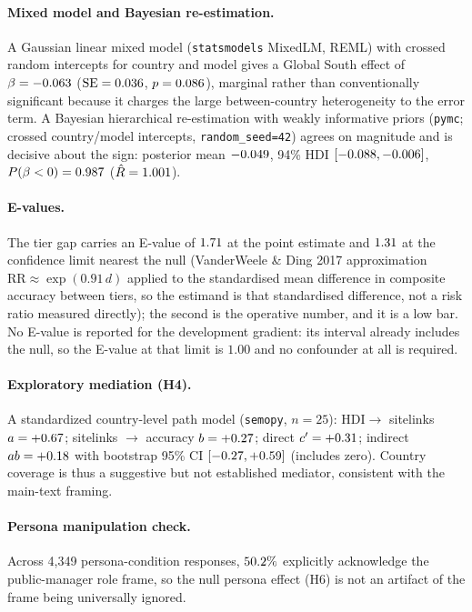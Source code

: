 \documentclass[11pt,a4paper]{article}
\begin{document}
\paragraph{Mixed model and Bayesian re-estimation.} A Gaussian linear mixed model
(\texttt{statsmodels} MixedLM, REML) with crossed random intercepts for country and
model gives a Global South effect of $\beta=-0.063$ ($\mathrm{SE}=0.036$,
$p=0.086$), marginal rather than conventionally significant because it charges the
large between-country heterogeneity to the error term. A Bayesian hierarchical
re-estimation with weakly informative priors (\texttt{pymc}; crossed country/model
intercepts, \texttt{random\_seed=42}) agrees on magnitude and is decisive about the
sign: posterior mean $-0.049$, 94\% HDI $[-0.088,-0.006]$, $P(\beta<0)=0.987$
($\hat{R}=1.001$).

\paragraph{E-values.} The tier gap carries an E-value of $1.71$ at the point
estimate and $1.31$ at the confidence limit nearest the null (VanderWeele \& Ding
2017 approximation $\mathrm{RR}\approx\exp(0.91\,d)$ applied to the standardised
mean difference in composite accuracy between tiers, so the estimand is that
standardised difference, not a risk ratio measured directly); the second is the
operative number, and it is a low bar. No E-value is reported for the development gradient:
its interval already includes the null, so the E-value at that limit is $1.00$ and
no confounder at all is required.

\paragraph{Exploratory mediation (H4).} A standardized country-level path model
(\texttt{semopy}, $n=25$): $\mathrm{HDI}\rightarrow$ sitelinks $a=+0.67$;
sitelinks $\rightarrow$ accuracy $b=+0.27$; direct $c'=+0.31$; indirect
$a b=+0.18$ with bootstrap 95\% CI $[-0.27,+0.59]$ (includes zero). Country
coverage is thus a suggestive but not established mediator, consistent with the
main-text framing.

\paragraph{Persona manipulation check.} Across 4{,}349 persona-condition responses,
$50.2\%$ explicitly acknowledge the public-manager role frame, so the null persona
effect (H6) is not an artifact of the frame being universally ignored.
\end{document}
